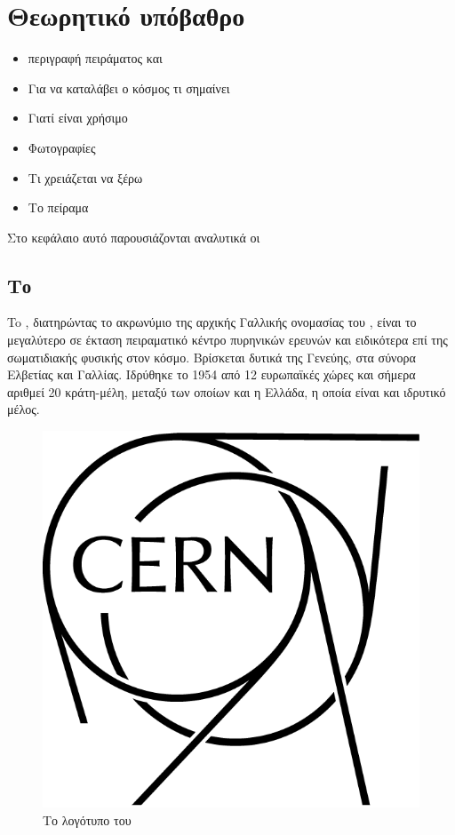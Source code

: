 \chapter{Θεωρητικό υπόβαθρο}
\begin{itemize}
\item περιγραφή πειράματος και
\item Για να καταλάβει ο κόσμος τι σημαίνει
\item Γιατί είναι χρήσιμο
\item Φωτογραφίες
\item Τι χρειάζεται να ξέρω
\item Το πείραμα
\end{itemize}

Στο κεφάλαιο αυτό παρουσιάζονται αναλυτικά οι 

\section{Το }

To , διατηρώντας το ακρωνύμιο της αρχικής Γαλλικής ονομασίας του , είναι το μεγαλύτερο σε έκταση πειραματικό κέντρο πυρηνικών ερευνών και ειδικότερα επί της σωματιδιακής φυσικής στον κόσμο. 
Βρίσκεται δυτικά της Γενεύης, στα σύνορα Ελβετίας και Γαλλίας. 
Ιδρύθηκε το 1954 από 12 ευρωπαϊκές χώρες και σήμερα αριθμεί 20 κράτη-μέλη, μεταξύ των οποίων και η Ελλάδα, η οποία είναι και ιδρυτικό μέλος.

\begin{figure}[h]
\includegraphics[scale=0.5]{images/LogoOutline-Black-01.png}
\centering
\caption{Το λογότυπο του }
\label{CERNlogo}
\end{figure}

